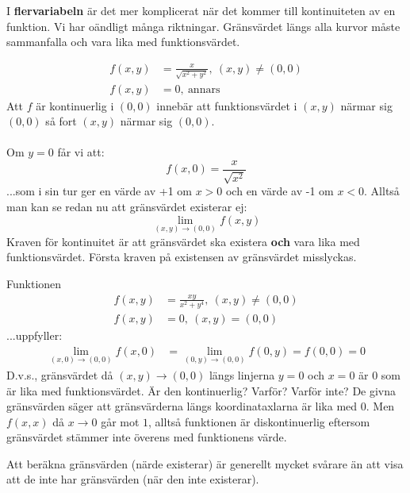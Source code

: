 \documentclass{report}
\begin{document}
\pagebreak
I \textbf{flervariabeln} är det mer komplicerat när det kommer till kontinuiteten av en funktion. Vi har oändligt många riktningar. Gränsvärdet längs alla kurvor måste sammanfalla och vara lika med funktionsvärdet.

\ex{}
{
\begin{align*}
	f(x,y) &= \frac{x}{ \sqrt{x^2+y^2} }, \: (x,y) \ne (0,0)\\
	f(x,y) &= 0, \: \text{annars} 
\end{align*}
Att $ f $ är kontinuerlig i $ (0,0) $ innebär att funktionsvärdet i $ (x,y) $ närmar sig $ (0,0) $  så fort $ (x,y) $ närmar sig $ (0,0) $.\\\\

Om $ y = 0 $ får vi att:
\begin{equation*}
f(x,0) = \frac{x}{ \sqrt{x^2} } 
\end{equation*}
...som i sin tur ger en värde av +1 om $ x > 0 $ och en värde av -1 om $ x < 0 $. Alltså man kan se redan nu att gränsvärdet existerar ej:
\begin{equation*}
\lim_{(x,y) \to (0,0)} f(x,y)
\end{equation*}
Kraven för kontinuitet är att gränsvärdet ska existera \textbf{och} vara lika med funktionsvärdet. Första kraven på existensen av gränsvärdet misslyckas.
}

\qs{}
{
Funktionen
\begin{align*}
	f(x,y) &= \frac{xy}{x^2+y^4}, \: (x,y) \ne (0,0)\\
	f(x,y) &= 0, \: (x,y) = (0,0)
\end{align*}
...uppfyller:
\begin{align*}
	\lim_{(x,0) \to (0,0)} f(x,0) &= \lim_{(0,y) \to (0,0)} f(0,y) = f(0,0) = 0
\end{align*}
D.v.s., gränsvärdet då $ (x,y) \to (0,0) $ längs linjerna $ y = 0 $ och $ x = 0 $ är 0 som är lika med funktionsvärdet. Är den kontinuerlig? Varför? Varför inte?
}
\sol De givna gränsvärden säger att gränsvärderna längs koordinataxlarna är lika med 0. Men $ f(x,x)  $ då $ x \to 0 $ går mot $ 1 $, alltså funktionen är diskontinuerlig eftersom gränsvärdet stämmer inte överens med funktionens värde.

\vspace{20pt}
Att beräkna gränsvärden (närde existerar) är generellt mycket svårare än att visa att de inte har gränsvärden (när den inte existerar).\\\\
\end{document}
